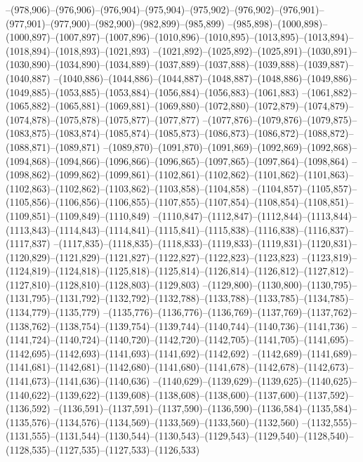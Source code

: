 --(978,906)--(976,906)--(976,904)--(975,904)--(975,902)--(976,902)--(976,901)--(977,901)--(977,900)--(982,900)--(982,899)--(985,899)
--(985,898)--(1000,898)--(1000,897)--(1007,897)--(1007,896)--(1010,896)--(1010,895)--(1013,895)--(1013,894)--(1018,894)--(1018,893)--(1021,893)
--(1021,892)--(1025,892)--(1025,891)--(1030,891)--(1030,890)--(1034,890)--(1034,889)--(1037,889)--(1037,888)--(1039,888)--(1039,887)--(1040,887)
--(1040,886)--(1044,886)--(1044,887)--(1048,887)--(1048,886)--(1049,886)--(1049,885)--(1053,885)--(1053,884)--(1056,884)--(1056,883)--(1061,883)
--(1061,882)--(1065,882)--(1065,881)--(1069,881)--(1069,880)--(1072,880)--(1072,879)--(1074,879)--(1074,878)--(1075,878)--(1075,877)--(1077,877)
--(1077,876)--(1079,876)--(1079,875)--(1083,875)--(1083,874)--(1085,874)--(1085,873)--(1086,873)--(1086,872)--(1088,872)--(1088,871)--(1089,871)
--(1089,870)--(1091,870)--(1091,869)--(1092,869)--(1092,868)--(1094,868)--(1094,866)--(1096,866)--(1096,865)--(1097,865)--(1097,864)--(1098,864)
--(1098,862)--(1099,862)--(1099,861)--(1102,861)--(1102,862)--(1101,862)--(1101,863)--(1102,863)--(1102,862)--(1103,862)--(1103,858)--(1104,858)
--(1104,857)--(1105,857)--(1105,856)--(1106,856)--(1106,855)--(1107,855)--(1107,854)--(1108,854)--(1108,851)--(1109,851)--(1109,849)--(1110,849)
--(1110,847)--(1112,847)--(1112,844)--(1113,844)--(1113,843)--(1114,843)--(1114,841)--(1115,841)--(1115,838)--(1116,838)--(1116,837)--(1117,837)
--(1117,835)--(1118,835)--(1118,833)--(1119,833)--(1119,831)--(1120,831)--(1120,829)--(1121,829)--(1121,827)--(1122,827)--(1122,823)--(1123,823)
--(1123,819)--(1124,819)--(1124,818)--(1125,818)--(1125,814)--(1126,814)--(1126,812)--(1127,812)--(1127,810)--(1128,810)--(1128,803)--(1129,803)
--(1129,800)--(1130,800)--(1130,795)--(1131,795)--(1131,792)--(1132,792)--(1132,788)--(1133,788)--(1133,785)--(1134,785)--(1134,779)--(1135,779)
--(1135,776)--(1136,776)--(1136,769)--(1137,769)--(1137,762)--(1138,762)--(1138,754)--(1139,754)--(1139,744)--(1140,744)--(1140,736)--(1141,736)
--(1141,724)--(1140,724)--(1140,720)--(1142,720)--(1142,705)--(1141,705)--(1141,695)--(1142,695)--(1142,693)--(1141,693)--(1141,692)--(1142,692)
--(1142,689)--(1141,689)--(1141,681)--(1142,681)--(1142,680)--(1141,680)--(1141,678)--(1142,678)--(1142,673)--(1141,673)--(1141,636)--(1140,636)
--(1140,629)--(1139,629)--(1139,625)--(1140,625)--(1140,622)--(1139,622)--(1139,608)--(1138,608)--(1138,600)--(1137,600)--(1137,592)--(1136,592)
--(1136,591)--(1137,591)--(1137,590)--(1136,590)--(1136,584)--(1135,584)--(1135,576)--(1134,576)--(1134,569)--(1133,569)--(1133,560)--(1132,560)
--(1132,555)--(1131,555)--(1131,544)--(1130,544)--(1130,543)--(1129,543)--(1129,540)--(1128,540)--(1128,535)--(1127,535)--(1127,533)--(1126,533)
